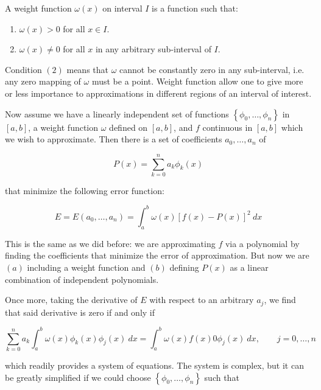 \documentclass[12pt]{article}
\theoremstyle{definition}
\begin{document}
A weight function $\omega(x)$ on interval $I$ is a function such that:

\begin{enumerate}
    \item $\omega(x) > 0$ for all $x \in I$. 
    \item $\omega(x) \neq 0$ for all $x$ in any arbitrary sub-interval of $I$.
\end{enumerate}

Condition $(2)$ means that $\omega$ cannot be constantly zero in any
sub-interval, i.e. any zero mapping of $\omega$ must be a point.
Weight function allow one to give more or less importance to approximations 
in different regions of an interval of interest. 

Now assume we have a linearly independent set of functions $\left\{ \phi_0,
\ldots, \phi_n \right\} $ in $[a, b]$, a weight function $\omega$ defined on
$[a, b]$, and $f$ continuous in $[a, b]$ which we wish to approximate. Then 
there is a set of coefficients $a_0, \ldots, a_n$ of 

\begin{equation*}
    P(x) = \sum_{k=0}^n a_k \phi_k(x)
\end{equation*}

that minimize the following error function:

\begin{equation*}
    E = E(a_0, \ldots, a_n) = \int_a^b \omega(x)\left[ f(x) -P(x) \right]^2 ~ dx
\end{equation*}

This is the same as we did before: we are approximating $f$ via a polynomial by
finding the coefficients that minimize the error of approximation. But now we
are $(a)$ including a weight function and $(b)$ defining $P(x)$ as a linear
combination of independent polynomials. 

Once more, taking the derivative of $E$ with respect to an arbitrary $a_j$, we
find that said derivative is zero if and only if 

\begin{equation*}
    \sum_{k=0}^n a_k \int_a^b \omega(x)\phi_k(x) \phi_j(x) ~ dx = \int_a^b
    \omega(x) f(x)0 \phi_j(x) ~ dx, \qquad j = 0, \ldots, n
\end{equation*}

which readily provides a system of equations. The system is complex, but it can
be greatly simplified if we could choose $\left\{ \phi_0, \ldots, \phi_n \right\} $
such that 
\end{document}

